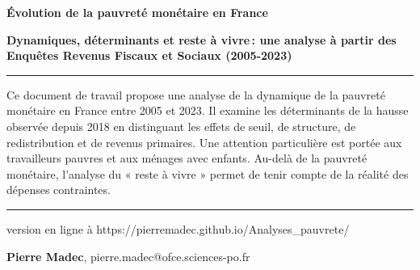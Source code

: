 \documentclass[
  french,
  9pt,
  a4paper,
]{article}
\begin{document}
\begin{titlepage}
\begin{minipage}{12.5cm}
        \vspace{2mm}
 \end{minipage}

\newpage
\pagestyle{empty}
\newpage
\pagestyle{empty}

\LARGE\textbf{Évolution de la pauvreté monétaire en France}

\large\textbf{Dynamiques, déterminants et reste à vivre\,: une analyse à
partir des Enquêtes Revenus Fiscaux et Sociaux (2005-2023)}

\vspace{1cm}


\par\rule{\textwidth}{0.5pt}

Ce document de travail propose une analyse de la dynamique de la
pauvreté monétaire en France entre 2005 et 2023. Il examine les
déterminants de la hausse observée depuis 2018 en distinguant les effets
de seuil, de structure, de redistribution et de revenus primaires. Une
attention particulière est portée aux travailleurs pauvres et aux
ménages avec enfants. Au-delà de la pauvreté monétaire, l'analyse du «
reste à vivre » permet de tenir compte de la réalité des dépenses
contraintes.

\par\rule{\textwidth}{0.5pt}


\vspace{1cm}


version en ligne à https://pierremadec.github.io/Analyses\_pauvrete/


\vspace{1cm}

\begin{flushright}
   \linespread{1}\small{\textbf{Pierre
Madec}}, {\small{pierre.madec@ofce.sciences-po.fr}}\par
\end{flushright}
\end{titlepage}
\end{document}
